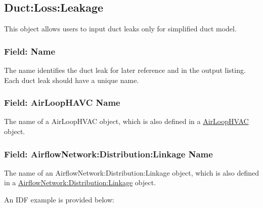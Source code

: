 \subsection{Duct:Loss:Leakage}\label{ductlossleakage}

This object allows users to input duct leaks only for simplified duct model.

\subsubsection{Field: Name}\label{ductloss-field-name-duct-leakage}

The name identifies the duct leak for later reference and in the output listing. Each duct leak should have a unique name.

\subsubsection{Field: AirLoopHAVC Name}\label{airloophavcname}

The name of a AirLoopHVAC object, which is also defined in a \hyperref[airloophvac]{AirLoopHVAC} object.

\subsubsection{Field: AirflowNetwork:Distribution:Linkage Name}\label{duct-leakage-airflownetworkdistributionlinkagename}

The name of an AirflowNetwork:Distribution:Linkage object, which is also defined in a \hyperref[airflownetworkdistributionlinkage]{AirflowNetwork:Distribution:Linkage} object.

An IDF example is provided below:

